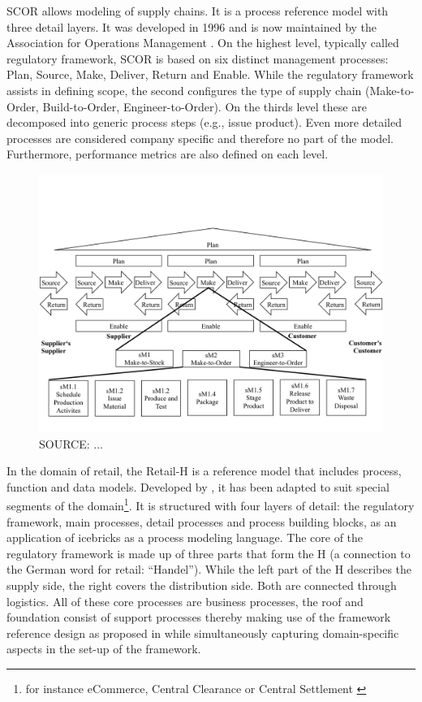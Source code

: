 		\acrshort{SCOR} allows modeling of supply chains. It is a process reference model with three detail layers. It was developed in 1996 and is now maintained by the Association for Operations Management \citep{APICS2015}. On the highest level, typically called regulatory framework, \acrshort{SCOR}  is based on six distinct management processes: Plan, Source, Make, Deliver, Return and Enable. While the regulatory framework assists in defining scope, the second configures the type of supply chain (Make-to-Order, Build-to-Order, Engineer-to-Order). On the thirds level these are decomposed into generic process steps (e.g., issue product). Even more detailed processes are considered company specific and therefore no part of the model. Furthermore, performance metrics are also defined on each level. 

		\begin{figure}[caption={SCOR Model}, label={fig:scor}]
		{	\includegraphics[width=.8\textwidth]{figures/scor.pdf}}
			\hspace{6.2cm}	SOURCE: ...
		\end{figure}
	
		\label{mod:retail}
		In the domain of retail, the Retail-H is a reference model that includes process, function and data models. Developed by \cite{becker2004handelsinformationssysteme}, it has been adapted to suit special segments of the domain\footnote{for instance eCommerce, Central Clearance or Central Settlement \citep{Puster2015}}. 
		It is structured with four layers of detail: the regulatory framework, main processes, detail processes and process building blocks, as an application of icebricks as a process modeling language. The core of the regulatory framework is made up of three parts that form the H (a connection to the German word for retail: \enquote{Handel}). While the left part of the H describes the supply side, the right covers the distribution side. Both are connected through logistics. All of these core processes are business processes, the roof and foundation consist of support processes thereby making use of the framework reference design as proposed in \cite{Meise2001} while simultaneously capturing domain-specific aspects in the set-up of the framework.  
		
